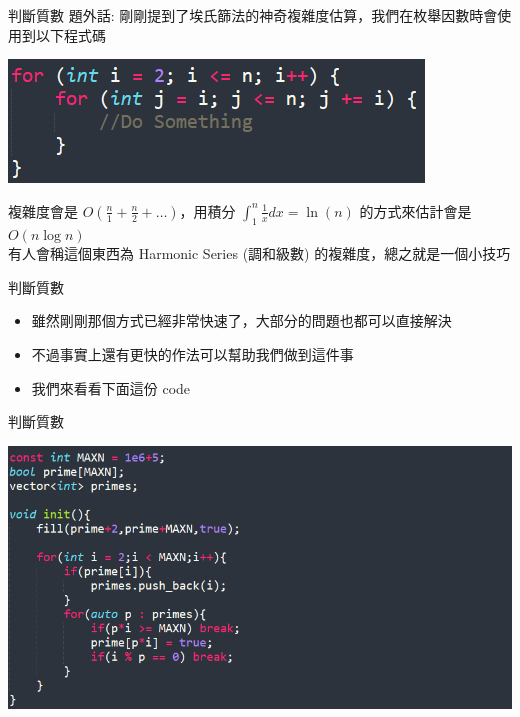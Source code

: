\documentclass[aspectratio=169]{beamer}
\begin{document}
\begin{frame}[fragile]{判斷質數}
    題外話: 剛剛提到了埃氏篩法的神奇複雜度估算，我們在枚舉因數時會使用到以下程式碼
    \begin{center}
        \includegraphics[]{images/code10.png}
    \end{center} \pause
    複雜度會是 $\displaystyle O(\frac{n}{1}+\frac{n}{2}+\dots)$，用積分 $\displaystyle \int^n_1 \frac{1}{x} dx = \ln(n)$ 的方式來估計會是 $O(n \log n)$ \\
    有人會稱這個東西為 Harmonic Series (調和級數) 的複雜度，總之就是一個小技巧
\end{frame}

\begin{frame}[fragile]{判斷質數}
    \begin{itemize}
        \item<1-> 雖然剛剛那個方式已經非常快速了，大部分的問題也都可以直接解決
        \item<1-> 不過事實上還有更快的作法可以幫助我們做到這件事
        \item<2-> 我們來看看下面這份 code
    \end{itemize}
\end{frame}

\begin{frame}[fragile]{判斷質數}
    \begin{center}
        \includegraphics[scale=0.6]{images/code5.png}
    \end{center}
\end{frame}
\end{document}
